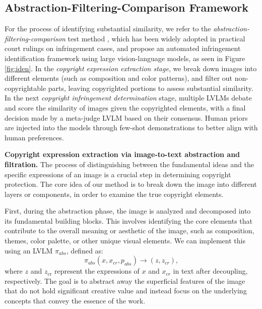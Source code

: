 \subsection{Abstraction-Filtering-Comparison Framework}
For the process of identifying substantial similarity, we refer to the \textit{abstraction-filtering-comparison} test method \cite{abramson2002promoting}, which has been widely adopted in practical court rulings on infringement cases, and propose an automated infringement identification framework using large vision-language models, as seen in Figure \ref{fig:iden}. In the \textit{copyright expression extraction stage}, we break down images into different elements (such as composition and color patterns), and filter out non-copyrightable parts, leaving copyrighted portions to assess substantial similarity. In the next \textit{copyright infringement determination} stage, multiple LVLMs debate and score the similarity of images given the copyrighted elements, with a final decision made by a meta-judge LVLM based on their consensus. Human priors are injected into the models through few-shot demonstrations to better align with human preferences. 

\textbf{Copyright expression extraction via image-to-text abstraction and filtration.} The process of distinguishing between the fundamental ideas and the specific expressions of an image is a crucial step in determining copyright protection. The core idea of our method is to break down the image into different layers or components, in order to examine the true copyright elements.

First, during the abstraction phase, the image is analyzed and decomposed into its fundamental building blocks. This involves identifying the core elements that contribute to the overall meaning or aesthetic of the image, such as composition, themes, color palette, or other unique visual elements. We can implement this using an LVLM $\pi_{abs}$, defined as:
\begin{equation}
\pi_{abs}(x, x_{{cr}}, p_{abs}) \to (z, z_{cr}),
\end{equation}
where $z$ and $z_\text{cr}$ represent the expressions of $x$ and $x_{{cr}}$ in text after decoupling, respectively.
The goal is to abstract away the superficial features of the image that do not hold significant creative value and instead focus on the underlying concepts that convey the essence of the work.

